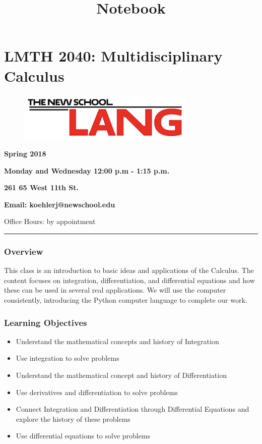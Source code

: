 \documentclass[11pt]{article}
\title{Notebook}
\makeatletter
\def\maxwidth{\ifdim\Gin@nat@width>\linewidth\linewidth
    \else\Gin@nat@width\fi}
\let\Oldincludegraphics\includegraphics
\renewcommand{\includegraphics}[1]{\Oldincludegraphics[width=.8\maxwidth]{#1}}
\providecommand{\tightlist}{%
      \setlength{\itemsep}{0pt}\setlength{\parskip}{0pt}}
\makeatother
\begin{document}
    
    
    \maketitle
    
    

    
    \section{LMTH 2040: Multidisciplinary
Calculus}\label{lmth-2040-multidisciplinary-calculus}
\label{sec:01-syllabus}
    \begin{figure}
\centering
\includegraphics{images/section_I/logo.jpg}
\caption{}
\end{figure}

\textbf{Spring 2018}

\textbf{Monday and Wednesday 12:00 p.m - 1:15 p.m.}

\textbf{261 65 West 11th St.}

\textbf{Email: koehlerj@newschool.edu}

Office Hours: by appointment

\begin{center}\rule{0.5\linewidth}{\linethickness}\end{center}

\subsubsection{Overview}\label{overview}

This class is an introduction to basic ideas and applications of the
Calculus. The content focuses on integration, differentiation, and
differential equations and how these can be used in several real
applications. We will use the computer consistently, introducing the
Python computer language to complete our work.

\subsubsection{Learning Objectives}\label{learning-objectives}

\begin{itemize}
\tightlist
\item
  Understand the mathematical concepts and history of Integration
\item
  Use integration to solve problems
\item
  Understand the mathematical concept and history of Differentiation
\item
  Use derivatives and differentiation to solve problems
\item
  Connect Integration and Differentiation through Differential Equations
  and explore the history of these problems
\item
  Use differential equations to solve problems
\end{itemize}
\end{document}
